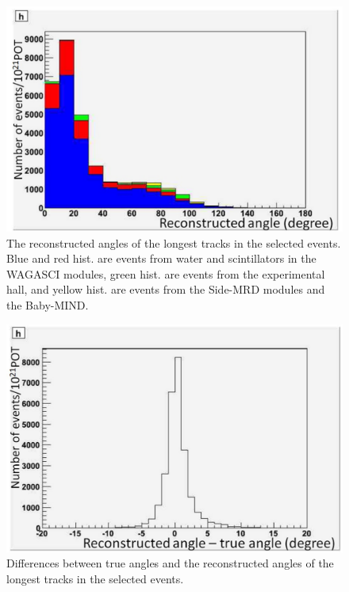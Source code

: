 \begin{figure}[tbh]
\begin{center}
\includegraphics[width=0.8\linewidth]{fig/angle_allcut_neutrino.pdf}
\end{center}
\caption{
The reconstructed angles of the longest tracks in the selected events.
Blue and red hist. are events from water and scintillators in the WAGASCI modules, green hist. are events from the experimental hall, and yellow hist. are events from the Side-MRD modules and the Baby-MIND.
}
\label{fig:angle_allcut_neutrino}
\end{figure}

\begin{figure}[tbh]
\begin{center}
\includegraphics[width=0.8\linewidth]{fig/angle_resolution_neutrino.pdf}
\end{center}
\caption{
Differences between true angles and the reconstructed angles of the longest tracks in the selected events.
}
\label{fig:angle_resolution_neutrino}
\end{figure}



